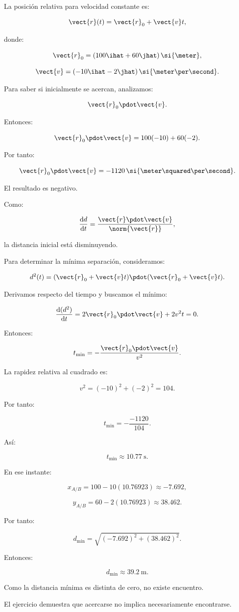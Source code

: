 \begin{explicacion}
La posición relativa para velocidad
constante es:

\[
\vect{r}(t)=\vect{r}_0+\vect{v}t,
\]

donde:

\[
\vect{r}_0
=
(100\ihat+60\jhat)\,\si{\meter},
\]

\[
\vect{v}
=
(-10\ihat-2\jhat)\,
\si{\meter\per\second}.
\]

Para saber si inicialmente se acercan,
analizamos:

\[
\vect{r}_0\pdot\vect{v}.
\]

Entonces:

\[
\vect{r}_0\pdot\vect{v}
=
100(-10)+60(-2).
\]

Por tanto:

\[
\vect{r}_0\pdot\vect{v}
=
-1120\,
\si{\meter\squared\per\second}.
\]

El resultado es negativo.

Como:

\[
\frac{\mathrm{d}d}{\mathrm{d}t}
=
\frac{\vect{r}\pdot\vect{v}}{\norm{\vect{r}}},
\]

la distancia inicial está disminuyendo.

Para determinar la mínima separación,
consideramos:

\[
d^2(t)
=
(\vect{r}_0+\vect{v}t)
\pdot
(\vect{r}_0+\vect{v}t).
\]

Derivamos respecto del tiempo y
buscamos el mínimo:

\[
\frac{\mathrm{d}(d^2)}{\mathrm{d}t}
=
2\vect{r}_0\pdot\vect{v}
+
2v^2t=0.
\]

Entonces:

\[
t_{\min}
=
-\frac{\vect{r}_0\pdot\vect{v}}{v^2}.
\]

La rapidez relativa al cuadrado es:

\[
v^2=(-10)^2+(-2)^2=104.
\]

Por tanto:

\[
t_{\min}
=
-\frac{-1120}{104}.
\]

Así:

\[
\boxed{
t_{\min}\approx
\SI{10.77}{\second}
}.
\]

En ese instante:

\[
x_{A/B}
=
100-10(10.76923)
\approx-7.692,
\]

\[
y_{A/B}
=
60-2(10.76923)
\approx38.462.
\]

Por tanto:

\[
d_{\min}
=
\sqrt{(-7.692)^2+(38.462)^2}.
\]

Entonces:

\[
\boxed{
d_{\min}\approx
\SI{39.2}{\meter}
}.
\]

Como la distancia mínima es distinta
de cero, no existe encuentro.

El ejercicio demuestra que acercarse
no implica necesariamente encontrarse.
\end{explicacion}


